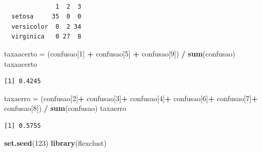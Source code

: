 \documentclass[12pt,brazil,oneside]{book}
\newenvironment{Shaded}{\begin{snugshade}}{\end{snugshade}}
\newcommand{\DecValTok}[1]{\textcolor[rgb]{0.00,0.00,0.81}{#1}}
\newcommand{\KeywordTok}[1]{\textcolor[rgb]{0.13,0.29,0.53}{\textbf{#1}}}
\newcommand{\NormalTok}[1]{#1}
\newcommand{\OperatorTok}[1]{\textcolor[rgb]{0.81,0.36,0.00}{\textbf{#1}}}
\newcommand{\StringTok}[1]{\textcolor[rgb]{0.31,0.60,0.02}{#1}}
\begin{document}
\begin{Shaded}
\end{Shaded}

\begin{verbatim}
            
              1  2  3
  setosa     35  0  0
  versicolor  0  2 34
  virginica   0 27  8
\end{verbatim}

\begin{Shaded}
\begin{Highlighting}[]
\NormalTok{taxaacerto =}\StringTok{ }\NormalTok{(confusao[}\DecValTok{1}\NormalTok{] }\OperatorTok{+}\StringTok{ }\NormalTok{confusao[}\DecValTok{5}\NormalTok{] }\OperatorTok{+}\StringTok{ }\NormalTok{confusao[}\DecValTok{9}\NormalTok{]) }\OperatorTok{/}\StringTok{ }\KeywordTok{sum}\NormalTok{(confusao)}
\NormalTok{taxaacerto}
\end{Highlighting}
\end{Shaded}

\begin{verbatim}
[1] 0.4245
\end{verbatim}

\begin{Shaded}
\begin{Highlighting}[]
\NormalTok{taxaerro =}\StringTok{ }\NormalTok{(confusao[}\DecValTok{2}\NormalTok{]}\OperatorTok{+}\StringTok{ }
\StringTok{            }\NormalTok{confusao[}\DecValTok{3}\NormalTok{]}\OperatorTok{+}
\StringTok{            }\NormalTok{confusao[}\DecValTok{4}\NormalTok{]}\OperatorTok{+}
\StringTok{            }\NormalTok{confusao[}\DecValTok{6}\NormalTok{]}\OperatorTok{+}
\StringTok{            }\NormalTok{confusao[}\DecValTok{7}\NormalTok{]}\OperatorTok{+}
\StringTok{            }\NormalTok{confusao[}\DecValTok{8}\NormalTok{]) }\OperatorTok{/}\StringTok{ }\KeywordTok{sum}\NormalTok{(confusao)}
\NormalTok{taxaerro}
\end{Highlighting}
\end{Shaded}

\begin{verbatim}
[1] 0.5755
\end{verbatim}

\begin{Shaded}
\begin{Highlighting}[]
\KeywordTok{set.seed}\NormalTok{(}\DecValTok{123}\NormalTok{)}
\KeywordTok{library}\NormalTok{(flexclust)}
\end{Highlighting}
\end{Shaded}
\end{document}
